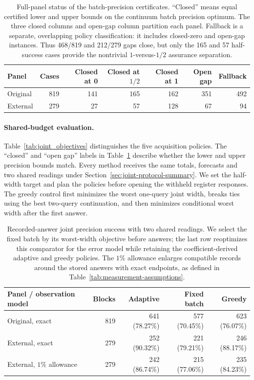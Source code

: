 \documentclass[12pt]{article}
\begin{document}
\begin{table}[htbp]
\centering\small
\begin{tabular}{lrrrrrr}
\toprule
Panel & Cases & Closed at 0 & Closed at $1/2$ & Closed at 1 & Open gap & Fallback\\
\midrule
Original & 819 & 141 & 165 & 162 & 351 & 492\\
External & 279 & 27 & 57 & 128 & 67 & 94\\
\bottomrule
\end{tabular}
\caption{Full-panel status of the batch-precision certificates. ``Closed'' means equal certified lower and upper bounds on the continuum batch precision optimum. The three closed columns and open-gap column partition each panel. Fallback is a separate, overlapping policy classification: it includes closed-zero and open-gap instances. Thus 468/819 and 212/279 gaps close, but only the 165 and 57 half-success cases provide the nontrivial $1$-versus-$1/2$ assurance separation.}
\label{tab:joint_precision_status}
\end{table}
\paragraph{Shared-budget evaluation.}
Table~\ref{tab:joint_objectives} distinguishes the five acquisition policies.
The ``closed'' and ``open gap'' labels in Table~\ref{tab:joint_precision_status}
describe whether the lower and upper precision bounds match.
Every method receives the same totals, forecasts and two shared readings
under Section~\ref{sec:joint-protocol-summary}. We set the half-width target
and plan the policies before opening the withheld register responses.
The greedy control first minimizes the worst one-query joint width, breaks
ties using the best two-query continuation, and then minimizes conditional
worst width after the first answer.

\begin{table}[t]
\centering\small
\begin{tabular}{lrrrr}
\toprule
Panel / observation model & Blocks & Adaptive & Fixed batch & Greedy\\
\midrule
Original, exact &819&641 (78.27\%)&577 (70.45\%)&623 (76.07\%)\\
External, exact &279&252 (90.32\%)&221 (79.21\%)&246 (88.17\%)\\
External, $1\%$ allowance &279&242 (86.74\%)&215 (77.06\%)&235 (84.23\%)\\
\bottomrule
\end{tabular}
\caption{Recorded-answer joint precision success with two shared readings.
We select the fixed batch by its worst-width objective before answers;
the last row reoptimizes this comparator for the error model while retaining
the coefficient-derived adaptive and greedy policies. The $1\%$ allowance
enlarges compatible records around the stored answers with exact endpoints,
as defined in Table~\ref{tab:measurement-assumptions}.}
\label{tab:joint_shared_replay}
\end{table}
\end{document}

